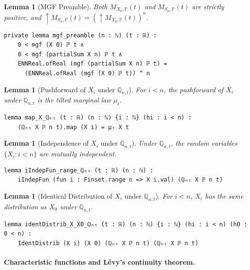 \documentclass{article}
\newtheorem{lemma}[theorem]{Lemma}
\renewcommand{\P}{\mathbb{P}}
\newcommand{\Q}{\mathbb{Q}}
\begin{document}
\begin{lemma}[MGF Preamble]
  Both $M_{X_0, \P}(t)$ and $M_{S_n, \P}(t)$ are strictly positive, and
  $\uparrow M_{S_n, \P}(t) = (\uparrow M_{X_0, \P}(t))^n$.
\end{lemma}
\begin{lstlisting}
private lemma mgf_preamble (n : ℕ) (t : ℝ) :
    0 < mgf (X 0) ℙ t ∧
    0 < mgf (partialSum X n) ℙ t ∧
    ENNReal.ofReal (mgf (partialSum X n) ℙ t) =
      (ENNReal.ofReal (mgf (X 0) ℙ t)) ^ n
\end{lstlisting}
\begin{lemma}[Pushforward of $X_i$ under $\Q_{n,t}$]
  For $i < n$, the pushforward of $X_i$ under $\Q_{n,t}$ is the tilted marginal law $\mu_t$.
\end{lemma}
\begin{lstlisting}
lemma map_X_ℚₙₜ (t : ℝ) (n : ℕ) {i : ℕ} (hi : i < n) :
    (ℚₙₜ X ℙ n t).map (X i) = μₜ X t
\end{lstlisting}
\newpage
\begin{lemma}[Independence of $X_i$ under $\Q_{n,t}$]
  Under $\Q_{n,t}$, the random variables $\{X_i : i < n\}$ are mutually independent.
\end{lemma}
\begin{lstlisting}
lemma iIndepFun_range_ℚₙₜ (t : ℝ) (n : ℕ) :
    iIndepFun (fun i : Finset.range n => X i.val) (ℚₙₜ X ℙ n t)
\end{lstlisting}
\begin{lemma}[Identical Distribution of $X_i$ under $\Q_{n,t}$]
  For $i < n$, $X_i$ has the same distribution as $X_0$ under $\Q_{n,t}$.
\end{lemma}
\begin{lstlisting}
lemma identDistrib_X_X0_ℚₙₜ (t : ℝ) (n : ℕ) {i : ℕ} (hi : i < n) (h0 : 0 < n) :
    IdentDistrib (X i) (X 0) (ℚₙₜ X ℙ n t) (ℚₙₜ X ℙ n t)
\end{lstlisting}
\paragraph{Characteristic functions and L{\'e}vy's continuity theorem.}
\end{document}
